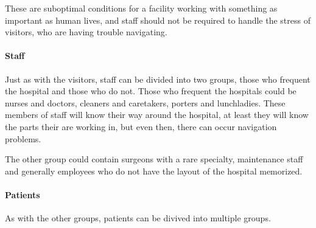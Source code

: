 These are suboptimal conditions for a facility working with something as important as human lives, and staff should not be required to handle the stress of visitors, who are having trouble navigating.

\paragraph{Staff} %

 
Just as with the visitors, staff can be divided into two groups, those who frequent the hospital and those who do not. Those who frequent the hospitals could be nurses and doctors, cleaners and caretakers, porters and lunchladies. These members of staff will know their way around the hospital, at least they will know the parts their are working in, but even then, there can occur navigation problems. 

The other group could contain surgeons with a rare specialty, maintenance staff and generally employees who do not have the layout of the hospital memorized.

\paragraph{Patients} %


As with the other groups, patients can be divived into multiple groups. 


